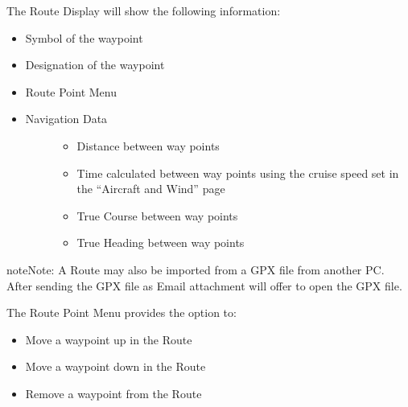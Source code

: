 \documentclass[letterpaper,10pt,english]{sphinxmanual}
\begin{document}
\sphinxAtStartPar
The Route Display will show the following information:
\begin{itemize}
\item {} 
\sphinxAtStartPar
Symbol of the waypoint

\item {} 
\sphinxAtStartPar
Designation of the waypoint

\item {} 
\sphinxAtStartPar
Route Point Menu

\item {} \begin{description}
\item[{Navigation Data}] \leavevmode\begin{itemize}
\item {} 
\sphinxAtStartPar
Distance between way points

\item {} 
\sphinxAtStartPar
Time calculated between way points using the cruise speed set in the “Aircraft and Wind” page

\item {} 
\sphinxAtStartPar
True Course between way points

\item {} 
\sphinxAtStartPar
True Heading between way points

\end{itemize}

\end{description}

\end{itemize}

\begin{sphinxadmonition}{note}{Note:}
\sphinxAtStartPar
A Route may also be imported from a GPX file from another PC. After
sending the GPX file as Email attachment 
will offer to open the GPX file.
\end{sphinxadmonition}

\sphinxAtStartPar
The Route Point Menu provides the option to:
\begin{itemize}
\item {} 
\sphinxAtStartPar
Move a waypoint up in the Route

\item {} 
\sphinxAtStartPar
Move a waypoint down in the Route

\item {} 
\sphinxAtStartPar
Remove a waypoint from the Route

\end{itemize}
\end{document}
